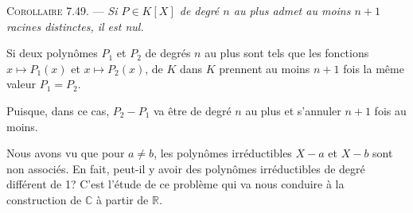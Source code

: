 \medskip\noindent\textsc{Corollaire 7.49.} --- \emph{Si $P\in K[X]$ de degré $n$ au plus admet au moins $n+1$ racines distinctes, il est nul.}

Si deux polynômes $P_1$ et $P_2$ de degrés $n$ au plus sont tels que les fonctions $x\longmapsto P_1(x)$ et $x\longmapsto P_2(x)$, de $K$ dans $K$ prennent au moins $n+1$ fois la même valeur $P_1=P_2$.

Puisque, dans ce cas, $P_2-P_1$ va être de degré $n$ au plus et s'annuler $n+1$ fois au moins. \bookend

Nous avons vu que pour $a\ne b$, les polynômes irréductibles $X-a$ et $X-b$ sont non associés. En fait, peut-il y avoir des polynômes irréductibles de degré différent de 1? C'est l'étude de ce problème qui va nous conduire à la construction de $\mathbb C$ à partir de $\mathbb R$.
